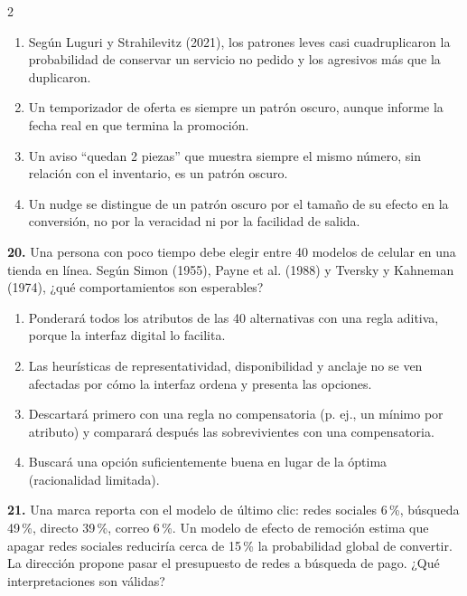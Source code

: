 \documentclass[10pt,letterpaper]{article}
\newcommand{\cas}{\framebox[1.0em]{\rule{0pt}{1.05ex}}}
\begin{document}
\begin{multicols}{2}
\begin{minipage}[t]{\columnwidth}
\begin{enumerate}[label=\cas\ \alph*),leftmargin=2.3em,itemsep=1.2pt,topsep=1pt,parsep=0pt,partopsep=0pt]
\item Según Luguri y Strahilevitz (2021), los patrones leves casi cuadruplicaron la probabilidad de conservar un servicio no pedido y los agresivos más que la duplicaron.
\item Un temporizador de oferta es siempre un patrón oscuro, aunque informe la fecha real en que termina la promoción.
\item Un aviso \enquote{quedan 2 piezas} que muestra siempre el mismo número, sin relación con el inventario, es un patrón oscuro.
\item Un nudge se distingue de un patrón oscuro por el tamaño de su efecto en la conversión, no por la veracidad ni por la facilidad de salida.
\end{enumerate}\end{minipage}\par\vspace{3pt}
\begin{minipage}[t]{\columnwidth}\noindent\textbf{20.} Una persona con poco tiempo debe elegir entre 40 modelos de celular en una tienda en línea. Según Simon (1955), Payne et al. (1988) y Tversky y Kahneman (1974), ¿qué comportamientos son esperables?
\vspace{1pt}\begin{enumerate}[label=\cas\ \alph*),leftmargin=2.3em,itemsep=1.2pt,topsep=1pt,parsep=0pt,partopsep=0pt]
\item Ponderará todos los atributos de las 40 alternativas con una regla aditiva, porque la interfaz digital lo facilita.
\item Las heurísticas de representatividad, disponibilidad y anclaje no se ven afectadas por cómo la interfaz ordena y presenta las opciones.
\item Descartará primero con una regla no compensatoria (p. ej., un mínimo por atributo) y comparará después las sobrevivientes con una compensatoria.
\item Buscará una opción suficientemente buena en lugar de la óptima (racionalidad limitada).
\end{enumerate}\end{minipage}\par\vspace{3pt}
\begin{minipage}[t]{\columnwidth}\noindent\textbf{21.} Una marca reporta con el modelo de último clic: redes sociales 6\,\%, búsqueda 49\,\%, directo 39\,\%, correo 6\,\%. Un modelo de efecto de remoción estima que apagar redes sociales reduciría cerca de 15\,\% la probabilidad global de convertir. La dirección propone pasar el presupuesto de redes a búsqueda de pago. ¿Qué interpretaciones son válidas?

\end{minipage}
\end{multicols}
\end{document}
